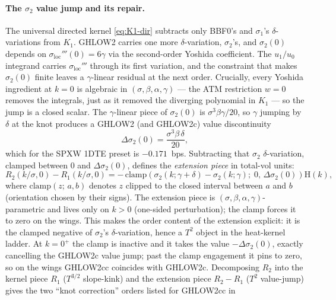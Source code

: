 \documentclass[11pt]{article}
\newcommand{\sloc}{\sigma_{\mathrm{loc}}}
\newcommand{\Hev}{\mathrm{H}}
\begin{document}
\paragraph{The $\sigma_2$ value jump and its repair.}
The universal directed kernel \eqref{eq:K1-dir} subtracts only BBF0's
and $\sigma_1$'s $\delta$-variations from $K_1$. GHLOW2 carries one
more $\delta$-variation, $\sigma_2$'s, and $\sigma_2(0)$ depends on
$\sloc'''(0)=6\gamma$ via the second-order Yoshida coefficient. The
$u_1/u_0$ integrand carries $\sloc'''$ through its first variation, and
the constraint that makes $\sigma_2(0)$ finite leaves a
$\gamma$-linear residual at the next order. Crucially, every Yoshida
ingredient at $k=0$ is algebraic in $(\sigma,\beta,\alpha,\gamma)$ ---
the ATM restriction $w=0$ removes the integrals, just as it removed the
diverging polynomial in $K_1$ --- so the jump is a closed scalar.
The $\gamma$-linear piece of $\sigma_2(0)$ is $\sigma^{3}\beta\gamma/20$,
so $\gamma$ jumping by $\delta$ at the knot produces a GHLOW2 (and
GHLOW2c) value discontinuity
\begin{equation}
\Delta\sigma_2(0)
= \frac{\sigma^{3}\beta\,\delta}{20},
\label{eq:ghlow2-gap}
\end{equation}
which for the SPXW 1DTE preset is $-0.171$~bps. Subtracting that
$\sigma_2$ $\delta$-variation, clamped between $0$ and $\Delta\sigma_2(0)$,
defines the \emph{extension piece} in total-vol units:
\begin{equation}
R_{2}(k/\sigma, 0) - R_{1}(k/\sigma, 0)
= -\,\mathrm{clamp}\!\left(
   \sigma_2(k;\gamma+\delta) - \sigma_2(k;\gamma);\;
   0,\,\Delta\sigma_2(0)
 \right)\Hev(k),
\label{eq:extension}
\end{equation}
where $\mathrm{clamp}(z;\,a,b)$ denotes $z$ clipped to the closed
interval between $a$ and $b$ (orientation chosen by their signs).
The extension piece is $(\sigma,\beta,\alpha,\gamma)$-parametric and
lives only on $k>0$ (one-sided perturbation); the clamp forces it to
zero on the wings.
This makes the order content of the extension explicit: it is the
clamped negative of $\sigma_2$'s $\delta$-variation, hence a $T^{2}$
object in the heat-kernel ladder. At $k=0^{+}$ the clamp is inactive
and it takes the value $-\Delta\sigma_2(0)$, exactly cancelling the
GHLOW2c value jump; past the clamp engagement it pins to zero, so on
the wings GHLOW2cc coincides with GHLOW2c. Decomposing $R_{2}$ into
the kernel piece $R_{1}$ ($T^{3/2}$ slope-kink) and the extension
piece $R_{2} - R_{1}$ ($T^{2}$ value-jump) gives the two ``knot
correction'' orders listed for GHLOW2cc in
\end{document}
